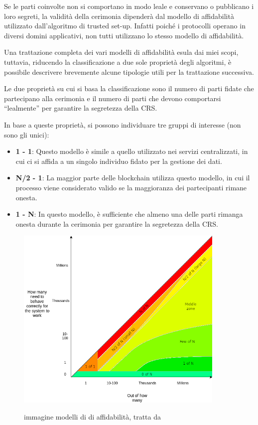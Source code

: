 Se le parti coinvolte non si comportano in modo leale e conservano o pubblicano i loro segreti, la validità della
cerimonia dipenderà dal modello di affidabilità utilizzato dall'algoritmo di trusted set-up. Infatti poiché i protocolli
operano in diversi domini applicativi, non tutti utilizzano lo stesso modello di affidabilità. 

Una trattazione completa dei vari modelli di affidabilità esula dai miei scopi, tuttavia, riducendo la classificazione a due sole proprietà
degli algoritmi, è possibile descrivere brevemente alcune tipologie utili per la trattazione successiva. 

Le due proprietà su cui si basa la classificazione sono il numero di parti fidate che partecipano alla cerimonia e il numero di
parti che devono comportarsi “lealmente” per garantire la segretezza della CRS.

In base a queste proprietà, si possono individuare tre gruppi di interesse (non sono gli unici):
\begin{itemize}
    \item \textbf{1 - 1}: Questo modello è simile a quello utilizzato nei servizi centralizzati, in cui ci si affida a un singolo
    individuo fidato per la gestione dei dati. 
    \item \textbf{N/2 - 1}: La maggior parte delle blockchain utilizza questo modello, in
    cui il processo viene considerato valido se la maggioranza dei partecipanti rimane onesta.
    \item \textbf{1 - N}: In questo modello, è sufficiente che almeno una delle parti rimanga onesta durante la
    cerimonia per garantire la segretezza della CRS.
\end{itemize}

\begin{figure}[H]
    \centering
    \includegraphics[width=10cm]{./chapters/1.state-of-art/images/12.trusted_models.png}
    \label{fig:trusted_models}
    \captionsetup{justification=centering}
    \caption{immagine modelli di di affidabilità, tratta da \cite{trusted-models}}
\end{figure}

